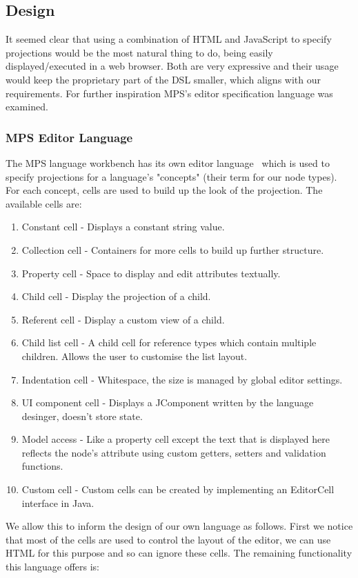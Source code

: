 \documentclass{article}
\begin{document}
{\subsection{Design}

It seemed clear that using a combination of HTML and JavaScript to specify projections would be the most natural thing to do, being easily displayed/executed in a web browser. Both are very expressive and their usage would keep the proprietary part of the DSL smaller, which aligns with our requirements. For further inspiration MPS's editor specification language was examined.

\subsubsection{MPS Editor Language}
The MPS language workbench has its own editor language~\cite{mpsEditorLanguage} which is used to specify projections for a language's "concepts" (their term for our node types). For each concept, cells are used to build up the look of the projection. The available cells are:
\begin{enumerate}
\item Constant cell - Displays a constant string value.
\item Collection cell - Containers for more cells to build up further structure.
\item Property cell - Space to display and edit attributes textually.
\item Child cell - Display the projection of a child.
\item Referent cell - Display a custom view of a child.
\item Child list cell - A child cell for reference types which contain multiple children. Allows the user to customise the list layout.
\item Indentation cell - Whitespace, the size is managed by global editor settings.
\item UI component cell - Displays a JComponent written by the language desinger, doesn't store state.
\item Model access - Like a property cell except the text that is displayed here reflects the node's attribute using custom getters, setters and validation functions.
\item Custom cell - Custom cells can be created by implementing an EditorCell interface in Java.
\end{enumerate}
%
We allow this to inform the design of our own language as follows. First we notice that most of the cells are used to control the layout of the editor, we can use HTML for this purpose and so can ignore these cells. The remaining functionality this language offers is:
}
\end{document}
